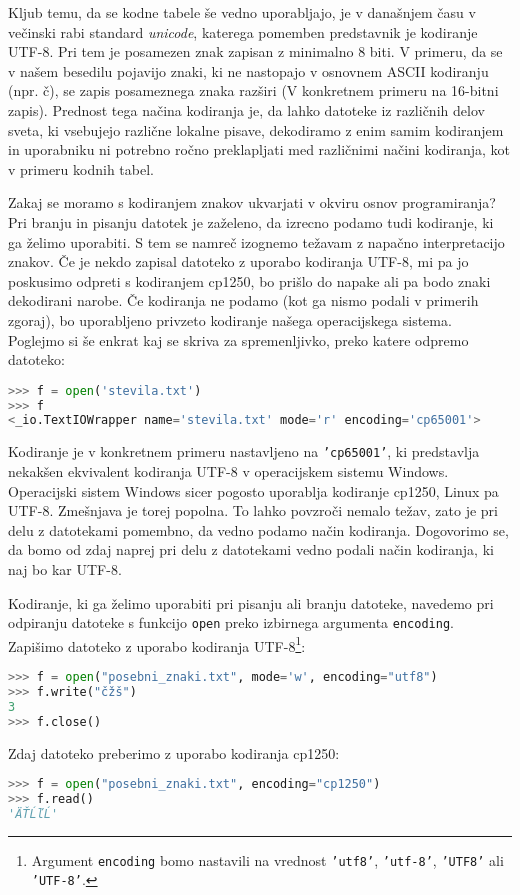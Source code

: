 Kljub temu, da se kodne tabele še vedno uporabljajo, je v današnjem času v večinski rabi standard \emph{unicode}, katerega pomemben predstavnik je kodiranje UTF-8. Pri tem je posamezen znak zapisan z minimalno 8 biti. V primeru, da se v našem besedilu pojavijo znaki, ki ne nastopajo v osnovnem ASCII kodiranju (npr. č), se zapis posameznega znaka razširi (V konkretnem primeru na 16-bitni zapis). Prednost tega načina kodiranja je, da lahko datoteke iz različnih delov sveta, ki vsebujejo različne lokalne pisave, dekodiramo z enim samim kodiranjem in uporabniku ni potrebno ročno preklapljati med različnimi načini kodiranja, kot v primeru kodnih tabel.

Zakaj se moramo s kodiranjem znakov ukvarjati v okviru osnov programiranja? Pri branju in pisanju datotek je zaželeno, da izrecno podamo tudi kodiranje, ki ga želimo uporabiti. S tem se namreč izognemo težavam z napačno interpretacijo znakov. Če je nekdo zapisal datoteko z uporabo kodiranja UTF-8, mi pa jo poskusimo odpreti s kodiranjem cp1250, bo prišlo do napake ali pa bodo znaki dekodirani narobe. Če kodiranja ne podamo (kot ga nismo podali v primerih zgoraj), bo uporabljeno privzeto kodiranje našega operacijskega sistema. Poglejmo si še enkrat kaj se skriva za spremenljivko, preko katere odpremo datoteko:
\begin{lstlisting}[language=Python, showstringspaces=false]
>>> f = open('stevila.txt')
>>> f 
<_io.TextIOWrapper name='stevila.txt' mode='r' encoding='cp65001'>
\end{lstlisting}
Kodiranje  je v konkretnem primeru nastavljeno na \texttt{'cp65001'}, ki predstavlja nekakšen ekvivalent kodiranja UTF-8 v operacijskem sistemu Windows. Operacijski sistem Windows sicer pogosto uporablja kodiranje cp1250, Linux pa UTF-8. Zmešnjava je torej popolna. To lahko povzroči nemalo težav, zato je pri delu z datotekami pomembno, da vedno podamo način kodiranja. Dogovorimo se, da bomo od zdaj naprej pri delu z datotekami vedno podali način kodiranja, ki naj bo kar UTF-8. 

Kodiranje, ki ga želimo uporabiti pri pisanju ali branju datoteke, navedemo pri odpiranju datoteke s funkcijo \texttt{open} preko izbirnega argumenta \texttt{encoding}. Zapišimo datoteko z uporabo kodiranja UTF-8\footnote{Argument \texttt{encoding} bomo nastavili na vrednost \texttt{'utf8'}, \texttt{'utf-8'}, \texttt{'UTF8'} ali \texttt{'UTF-8'}.}:
\begin{lstlisting}[language=Python, showstringspaces=false]
>>> f = open("posebni_znaki.txt", mode='w', encoding="utf8")
>>> f.write("čžš")
3
>>> f.close()
\end{lstlisting}
Zdaj datoteko preberimo z uporabo kodiranja cp1250:
\begin{lstlisting}[language=Python, showstringspaces=false]
>>> f = open("posebni_znaki.txt", encoding="cp1250")
>>> f.read()
'ÄŤĹľĹ'
\end{lstlisting}

